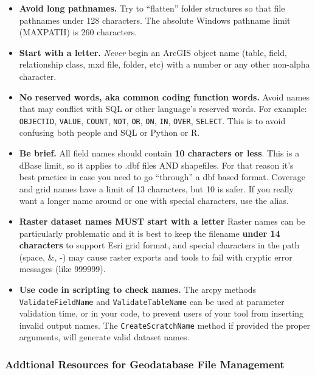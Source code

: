 \documentclass[
]{book}
\begin{document}
\begin{itemize}
\item
  \textbf{Avoid long pathnames.}
  Try to ``flatten'' folder structures so that file pathnames under 128 characters. The absolute Windows pathname limit (MAXPATH) is 260 characters.
\item
  \textbf{Start with a letter.}
  \emph{Never} begin an ArcGIS object name (table, field, relationship class, mxd file, folder, etc) with a number or any other non-alpha character.
\item
  \textbf{No reserved words, aka common coding function words.}
  Avoid names that may conflict with SQL or other language's reserved words. For example: \texttt{OBJECTID}, \texttt{VALUE}, \texttt{COUNT}, \texttt{NOT}, \texttt{OR}, \texttt{ON}, \texttt{IN}, \texttt{OVER}, \texttt{SELECT}. This is to avoid confusing both people and SQL or Python or R.
\item
  \textbf{Be brief.}
  All field names should contain \textbf{10 characters or less}. This is a dBase limit, so it applies to .dbf files AND shapefiles. For that reason it's best practice in case you need to go ``through'' a dbf based format. Coverage and grid names have a limit of 13 characters, but 10 is safer. If you really want a longer name around or one with special characters, use the alias.
\item
  \textbf{Raster dataset names MUST start with a letter}
  Raster names can be particularly problematic and it is best to keep the filename \textbf{under 14 characters} to support Esri grid format, and special characters in the path (space, \&, -) may cause raster exports and tools to fail with cryptic error messages (like 999999).
\item
  \textbf{Use code in scripting to check names.}
  The arcpy methods \texttt{ValidateFieldName} and \texttt{ValidateTableName} can be used at parameter validation time, or in your code, to prevent users of your tool from inserting invalid output names. The \texttt{CreateScratchName} method if provided the proper arguments, will generate valid dataset names.
\end{itemize}

\hypertarget{addtional-resources-for-geodatabase-file-management}{%
\subsubsection{Addtional Resources for Geodatabase File Management}\label{addtional-resources-for-geodatabase-file-management}}
\end{document}
